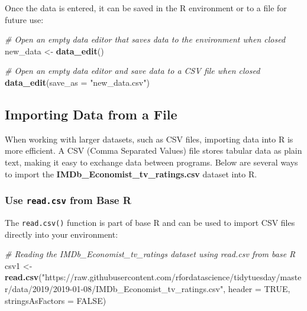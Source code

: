 \documentclass[
]{book}
\newenvironment{Shaded}{\begin{snugshade}}{\end{snugshade}}
\newcommand{\AttributeTok}[1]{\textcolor[rgb]{0.13,0.29,0.53}{#1}}
\newcommand{\CommentTok}[1]{\textcolor[rgb]{0.56,0.35,0.01}{\textit{#1}}}
\newcommand{\ConstantTok}[1]{\textcolor[rgb]{0.56,0.35,0.01}{#1}}
\newcommand{\FunctionTok}[1]{\textcolor[rgb]{0.13,0.29,0.53}{\textbf{#1}}}
\newcommand{\NormalTok}[1]{#1}
\newcommand{\OtherTok}[1]{\textcolor[rgb]{0.56,0.35,0.01}{#1}}
\newcommand{\StringTok}[1]{\textcolor[rgb]{0.31,0.60,0.02}{#1}}
\begin{document}
Once the data is entered, it can be saved in the R environment or to a file for future use:

\begin{Shaded}
\begin{Highlighting}[]
\CommentTok{\# Open an empty data editor that saves data to the environment when closed}
\NormalTok{new\_data }\OtherTok{\textless{}{-}} \FunctionTok{data\_edit}\NormalTok{()}

\CommentTok{\# Open an empty data editor and save data to a CSV file when closed}
\FunctionTok{data\_edit}\NormalTok{(}\AttributeTok{save\_as =} \StringTok{"new\_data.csv"}\NormalTok{)}
\end{Highlighting}
\end{Shaded}

\subsection*{Importing Data from a File}\label{importing-data-from-a-file}

When working with larger datasets, such as CSV files, importing data into R is more efficient. A CSV (Comma Separated Values) file stores tabular data as plain text, making it easy to exchange data between programs. Below are several ways to import the \textbf{IMDb\_Economist\_tv\_ratings.csv} dataset into R.

\subsubsection*{\texorpdfstring{Use \texttt{read.csv} from Base R}{Use read.csv from Base R}}\label{use-read.csv-from-base-r}

The \texttt{read.csv()} function is part of base R and can be used to import CSV files directly into your environment:

\begin{Shaded}
\begin{Highlighting}[]
\CommentTok{\# Reading the IMDb\_Economist\_tv\_ratings dataset using read.csv from base R}
\NormalTok{csv1 }\OtherTok{\textless{}{-}} \FunctionTok{read.csv}\NormalTok{(}\StringTok{"https://raw.githubusercontent.com/rfordatascience/tidytuesday/master/data/2019/2019{-}01{-}08/IMDb\_Economist\_tv\_ratings.csv"}\NormalTok{, }\AttributeTok{header =} \ConstantTok{TRUE}\NormalTok{, }\AttributeTok{stringsAsFactors =} \ConstantTok{FALSE}\NormalTok{)}
\end{Highlighting}
\end{Shaded}
\end{document}
